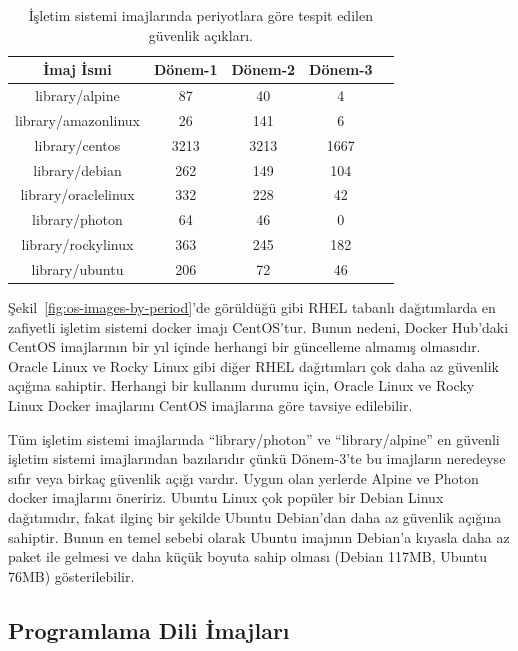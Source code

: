 \begin{table}[!htbp]
    \caption{İşletim sistemi imajlarında periyotlara göre tespit edilen güvenlik açıkları.}\label{tab:os-images-by-period}
    \centering
    \begin{tabular}{ |c|c|c|c|c| }
        \hline
        İmaj İsmi & Dönem-1 & Dönem-2 & Dönem-3 \\
        \hline
        library/alpine      &   87 &   40 & 4 \\
        library/amazonlinux &   26 &  141 & 6 \\
        library/centos      & 3213 & 3213 & 1667 \\
        library/debian      &  262 &  149 & 104 \\
        library/oraclelinux &  332 &  228 & 42 \\
        library/photon      &   64 &   46 & 0 \\
        library/rockylinux  &  363 &  245 & 182 \\
        library/ubuntu      &  206 &   72 & 46 \\
        \hline
    \end{tabular}
\end{table}

Şekil~\ref{fig:os-images-by-period}'de görüldüğü gibi RHEL tabanlı dağıtımlarda en zafiyetli işletim sistemi docker imajı CentOS'tur. Bunun nedeni, Docker Hub'daki CentOS imajlarının bir yıl içinde herhangi bir güncelleme almamış olmasıdır. Oracle Linux ve Rocky Linux gibi diğer RHEL dağıtımları çok daha az güvenlik açığına sahiptir. Herhangi bir kullanım durumu için, Oracle Linux ve Rocky Linux Docker imajlarını CentOS imajlarına göre tavsiye edilebilir.

Tüm işletim sistemi imajlarında ``library/photon'' ve ``library/alpine'' en güvenli işletim sistemi imajlarından bazılarıdır çünkü Dönem-3'te bu imajların neredeyse sıfır veya birkaç güvenlik açığı vardır. Uygun olan yerlerde Alpine ve Photon docker imajlarını öneririz. Ubuntu Linux çok popüler bir Debian Linux dağıtımıdır, fakat ilginç bir şekilde Ubuntu Debian'dan daha az güvenlik açığına sahiptir. Bunun en temel sebebi olarak Ubuntu imajının Debian'a kıyasla daha az paket ile gelmesi ve daha küçük boyuta sahip olması (Debian 117MB, Ubuntu 76MB) gösterilebilir.

\subsection{Programlama Dili İmajları}\label{subsec:prog-lang-images}

